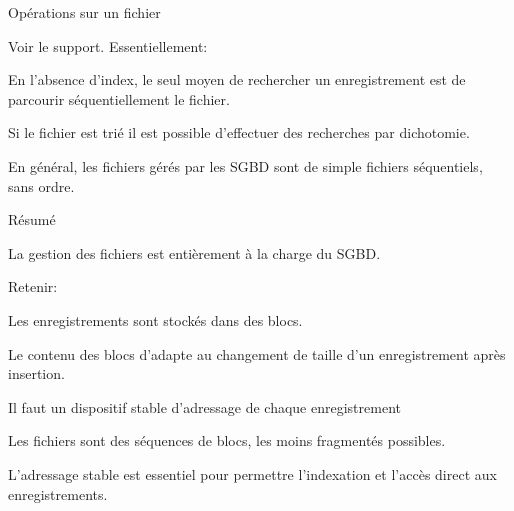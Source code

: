 \begin{frame}{Opérations sur un fichier}

Voir le support. Essentiellement:


\vfill

\begin{redbullet}
   \item En l'absence d'index, le seul moyen de
rechercher un enregistrement est de parcourir
\alert{séquentiellement} le fichier.

  \item Si le fichier est trié il est possible d'effectuer des recherches
   par \alert{dichotomie}.
\end{redbullet}

\vfill

\begin{blocgauche}
En général, les fichiers gérés par les SGBD sont de simple
fichiers séquentiels, sans ordre.
\end{blocgauche}

\end{frame}

\begin{frame}{Résumé}

La gestion des fichiers est entièrement à la charge du SGBD.

\vfill 
\alert{Retenir}:

\begin{redbullet}
  \item Les enregistrements sont stockés dans des blocs.
  \item Le contenu des blocs d'adapte au changement de taille d'un enregistrement après insertion.
  \item \alert{Il faut un dispositif stable d'adressage de chaque enregistrement}
  \item Les fichiers sont des séquences de blocs, les moins fragmentés possibles.
\end{redbullet}

\vfill

\begin{blocgauche}
L'adressage stable est essentiel pour permettre l'indexation
et l'accès direct aux enregistrements.
\end{blocgauche}

\end{frame}